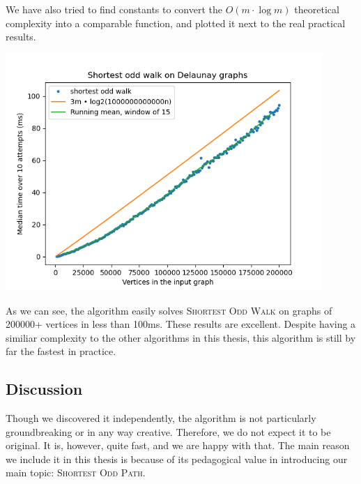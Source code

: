 We have also tried to find constants to convert the $O(m \cdot \log m)$ theoretical complexity into a comparable function, and plotted it next to the real practical results.

\includegraphics[width=12cm]{figures/bench_plots/shortest odd walk.png}

As we can see, the algorithm easily solves \textsc{Shortest Odd Walk} on graphs of 200000+ vertices in less than 100ms. These results are excellent. Despite having a similiar complexity to the other algorithms in this thesis, this algorithm is still by far the fastest in practice.

\subsection{Discussion}
Though we discovered it independently, the algorithm is not particularly groundbreaking or in any way creative. Therefore, we do not expect it to be original. It is, however, quite fast, and we are happy with that. The main reason we include it in this thesis is because of its pedagogical value in introducing our main topic: \textsc{Shortest Odd Path}. 
